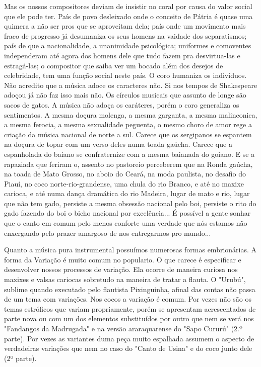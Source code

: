Mas os nossos compositores deviam de insistir no coral por causa do
valor social que ele pode ter. País de povo desleixado onde o conceito
de Pátria é quase uma quimera a não ser pros que se aproveitam dela;
país onde um movimento mais fraco de progresso já desumaniza os seus
homens na vaidade dos separatismos; país de que a nacionalidade, a
unanimidade psicológica; uniformes e comoventes independeram até agora
dos homens dele que tudo fazem pra desvirtua-las e estragá-las; o
compositor que saiba ver um bocado além dos desejos de celebridade, tem
uma função social neste país. O coro humaniza os indivíduos. Não
acredito que a música adoce os caracteres não. Si nos tempos de
Shakespeare adoçou já não faz isso mais não. Os círculos musicais que
assunto de longe são sacos de gatos. A música não adoça os caráteres,
porém o coro generaliza os sentimentos. A mesma doçura molenga, a mesma
garganta, a mesma malinconica, a mesma ferocia, a mesma sexualidade
peguenta, o mesmo choro de amor rege a criação da música nacional de
norte a sul. Carece que os sergipanos se espantem na doçura de topar com
um verso deles numa toada gaúcha. Carece que a espanholada do baiano se
confraternize com a mesma baianada do goiano. E se a rapaziada que
feriram o, assento no pastoreio perceberem que na Ronda gaúcha, na toada
de Mato Grosso, no aboio do Ceará, na moda paulista, no desafio do
Piauí, no coco norte-rio-grandense, uma chula do rio Branco, e até no
maxixe carioca, e até numa dança dramática do rio Madeira, lugar de mato
e rio, lugar que não tem gado, persiste a mesma obsessão nacional pelo
boi, persiste o rito do gado fazendo do boi o bicho nacional por
excelência... É possível a gente sonhar que o canto em comum pelo menos
conforte uma verdade que nós estamos não enxergando pelo prazer amargoso
de nos entregarmos pro mundo...~

Quanto a música pura instrumental possuímos numerosas formas
embrionárias. A forma da Variação é muito comum no populario. O que
carece é especificar e desenvolver nossos processos de variação. Ela
ocorre de maneira curiosa nos maxixes e valsas cariocas sobretudo na
maneira de tratar a flauta. O "Urubú", sublime quando executado pelo
flautista Pixinguinha, afinal das contas não passa de um tema com
variações. Nos cocos a variação é comum. Por vezes não são os temas
estróficos que variam propriamente, porém se apresentam acrescentados de
parte nova ou com um dos elementos substituídos por outro que nem se
verá nos "Fandangos da Madrugada" e na versão araraquarense do "Sapo
Cururú" (2.º parte). Por vezes as variantes duma peça muito espalhada
assumem o aspecto de verdadeiras variações que nem no caso do "Canto de
Usina" e do coco junto dele (2º parte).

